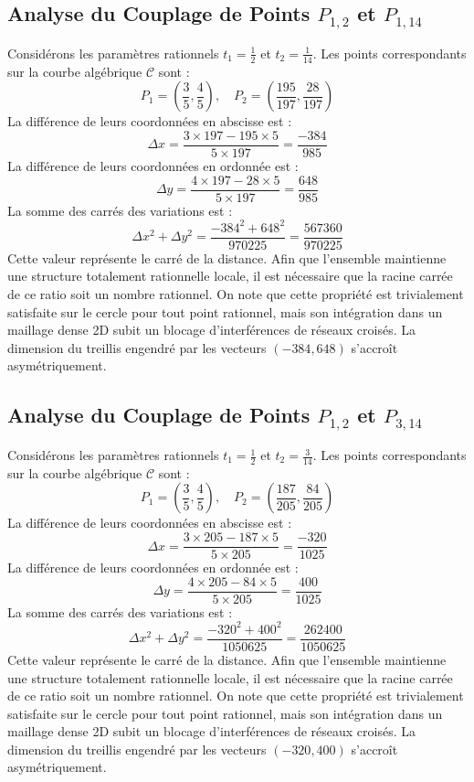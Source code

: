 \documentclass[12pt, a4paper]{article}
\begin{document}
\subsection{Analyse du Couplage de Points $P_{1,2}$ et $P_{1,14}$}
Considérons les paramètres rationnels $t_1 = \frac{1}{2}$ et $t_2 = \frac{1}{14}$.
Les points correspondants sur la courbe algébrique $\mathcal{C}$ sont :
$$ P_1 = \left( \frac{3}{5}, \frac{4}{5} \right), \quad P_2 = \left( \frac{195}{197}, \frac{28}{197} \right) $$
La différence de leurs coordonnées en abscisse est :
$$ \Delta x = \frac{3 \times 197 - 195 \times 5}{5 \times 197} = \frac{-384}{985} $$
La différence de leurs coordonnées en ordonnée est :
$$ \Delta y = \frac{4 \times 197 - 28 \times 5}{5 \times 197} = \frac{648}{985} $$
La somme des carrés des variations est :
$$ \Delta x^2 + \Delta y^2 = \frac{ -384^2 + 648^2 }{ 970225 } = \frac{ 567360 }{ 970225 } $$
Cette valeur représente le carré de la distance. Afin que l'ensemble maintienne une structure totalement rationnelle locale, il est nécessaire que la racine carrée de ce ratio soit un nombre rationnel. On note que cette propriété est trivialement satisfaite sur le cercle pour tout point rationnel, mais son intégration dans un maillage dense 2D subit un blocage d'interférences de réseaux croisés. La dimension du treillis engendré par les vecteurs $( -384, 648 )$ s'accroît asymétriquement.


\subsection{Analyse du Couplage de Points $P_{1,2}$ et $P_{3,14}$}
Considérons les paramètres rationnels $t_1 = \frac{1}{2}$ et $t_2 = \frac{3}{14}$.
Les points correspondants sur la courbe algébrique $\mathcal{C}$ sont :
$$ P_1 = \left( \frac{3}{5}, \frac{4}{5} \right), \quad P_2 = \left( \frac{187}{205}, \frac{84}{205} \right) $$
La différence de leurs coordonnées en abscisse est :
$$ \Delta x = \frac{3 \times 205 - 187 \times 5}{5 \times 205} = \frac{-320}{1025} $$
La différence de leurs coordonnées en ordonnée est :
$$ \Delta y = \frac{4 \times 205 - 84 \times 5}{5 \times 205} = \frac{400}{1025} $$
La somme des carrés des variations est :
$$ \Delta x^2 + \Delta y^2 = \frac{ -320^2 + 400^2 }{ 1050625 } = \frac{ 262400 }{ 1050625 } $$
Cette valeur représente le carré de la distance. Afin que l'ensemble maintienne une structure totalement rationnelle locale, il est nécessaire que la racine carrée de ce ratio soit un nombre rationnel. On note que cette propriété est trivialement satisfaite sur le cercle pour tout point rationnel, mais son intégration dans un maillage dense 2D subit un blocage d'interférences de réseaux croisés. La dimension du treillis engendré par les vecteurs $( -320, 400 )$ s'accroît asymétriquement.
\end{document}
